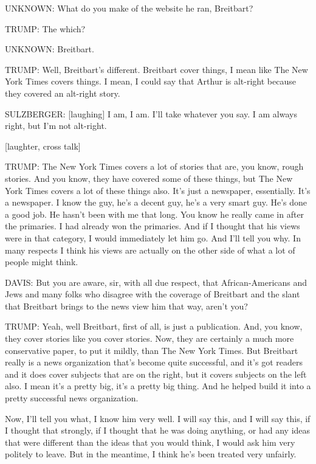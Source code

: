 UNKNOWN: What do you make of the website he ran, Breitbart?

TRUMP: The which?

UNKNOWN: Breitbart.

TRUMP: Well, Breitbart's different. Breitbart cover things, I mean like
The New York Times covers things. I mean, I could say that Arthur is
alt-right because they covered an alt-right story.

SULZBERGER: {[}laughing{]} I am, I am. I'll take whatever you say. I am
always right, but I'm not alt-right.

{[}laughter, cross talk{]}

TRUMP: The New York Times covers a lot of stories that are, you know,
rough stories. And you know, they have covered some of these things, but
The New York Times covers a lot of these things also. It's just a
newspaper, essentially. It's a newspaper. I know the guy, he's a decent
guy, he's a very smart guy. He's done a good job. He hasn't been with me
that long. You know he really came in after the primaries. I had already
won the primaries. And if I thought that his views were in that
category, I would immediately let him go. And I'll tell you why. In many
respects I think his views are actually on the other side of what a lot
of people might think.

DAVIS: But you are aware, sir, with all due respect, that
African-Americans and Jews and many folks who disagree with the coverage
of Breitbart and the slant that Breitbart brings to the news view him
that way, aren't you?

TRUMP: Yeah, well Breitbart, first of all, is just a publication. And,
you know, they cover stories like you cover stories. Now, they are
certainly a much more conservative paper, to put it mildly, than The New
York Times. But Breitbart really is a news organization that's become
quite successful, and it's got readers and it does cover subjects that
are on the right, but it covers subjects on the left also. I mean it's a
pretty big, it's a pretty big thing. And he helped build it into a
pretty successful news organization.

Now, I'll tell you what, I know him very well. I will say this, and I
will say this, if I thought that strongly, if I thought that he was
doing anything, or had any ideas that were different than the ideas that
you would think, I would ask him very politely to leave. But in the
meantime, I think he's been treated very unfairly.

\href{https://www.nytimes.com/interactive/2016/11/11/us/politics/what-trump-wants-to-change.html}{}

